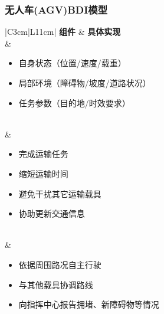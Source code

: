 \documentclass[12pt,a4paper]{article}
\begin{document}
\subsubsection{无人车(AGV)BDI模型}
\begin{table}[h]
	\centering
	\caption{无人车BDI模型}
	\label{tab:agv-bdi}
	\begin{tabular}{|C{3cm}|L{11cm}|}
		\hline
		\textbf{组件} & \textbf{具体实现} \\
		\hline
		 & 
		\begin{minipage}[t]{\linewidth}
			\begin{itemize}[leftmargin=*, nosep, topsep=0pt, itemsep=3pt]
				\item 自身状态（位置/速度/载重）
				\item 局部环境（障碍物/坡度/道路状况）
				\item 任务参数（目的地/时效要求）
			\end{itemize}
		\end{minipage} \\
		\hline
		 & 
		\begin{minipage}[t]{\linewidth}
			\begin{itemize}[leftmargin=*, nosep, topsep=0pt, itemsep=3pt]
				\item 完成运输任务
				\item 缩短运输时间
				\item 避免干扰其它运输载具
				\item 协助更新交通信息
			\end{itemize}
		\end{minipage} \\
		\hline
		 & 
		\begin{minipage}[t]{\linewidth}
			\begin{itemize}[leftmargin=*, nosep, topsep=0pt, itemsep=3pt]
				\item 依据周围路况自主行驶
				\item 与其他载具协调路线
				\item 向指挥中心报告拥堵、新障碍物等情况
			\end{itemize}
		\end{minipage} \\
		\hline
	\end{tabular}
\end{table}
\FloatBarrier
\end{document}
